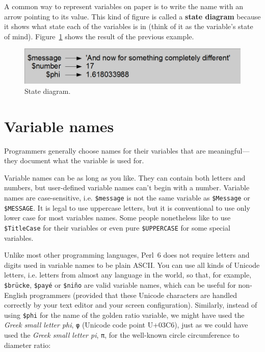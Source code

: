 A common way to represent variables on paper is to write the name with
an arrow pointing to its value.  This kind of figure is
called a {\bf state diagram} because it shows what state each of the
variables is in (think of it as the variable's state of mind).
Figure~\ref{fig.state2} shows the result of the previous example.

\begin{figure}
\centerline
{\includegraphics[scale=0.6]{figs/test_5.png}}
\caption{State diagram.}
\label{fig.state2}
\end{figure}



\section{Variable names}

Programmers generally choose names for their variables that
are meaningful---they document what the variable is used for.

Variable names can be as long as you like.  They can contain
both letters and numbers, but user-defined variable names 
can't begin with a number. Variable names are case-sensitive, 
i.e. {\tt \$message} is not the same variable as {\tt \$Message} 
or {\tt \$MESSAGE}. It is legal to use uppercase letters, but 
it is conventional to use only lower case for most variables 
names. Some people nonetheless like to use {\tt \$TitleCase} 
for their variables or even pure {\tt \$UPPERCASE} for 
some special variables.


Unlike most other programming languages, Perl~6 does not require letters 
and digits used in variable names to be plain ASCII. 
You can use all kinds of Unicode letters, i.e. 
letters from almost any language in the world, so that, for example,  
{\tt \$brücke}, {\tt \$payé} or {\tt \$niño} are 
valid variable names, which can be useful for non-English 
programmers (provided that these Unicode characters are 
handled correctly by your text editor and your 
screen configuration). Similarly, instead of using 
\verb"$phi" for the name of the golden ratio variable, 
we might have used the \emph{Greek small letter phi}, \verb'φ' 
(Unicode code point U+03C6), just as we could have used 
the \emph{Greek small letter pi}, \verb'π',  for the well-known 
circle circumference to diameter ratio:

